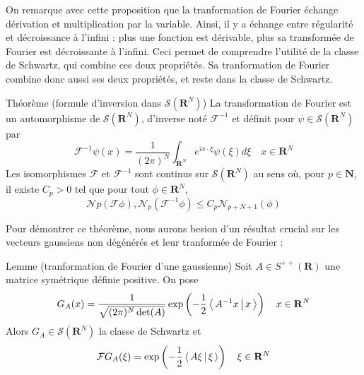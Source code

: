         On remarque avec cette proposition que la tranformation de Fourier échange dérivation et multiplication par la variable. Ainsi, il y a échange entre régularité et décroissance à l’infini : plus une fonction est dérivable, plus sa transformée de Fourier est décroissante à l’infini. Ceci permet de comprendre l’utilité de la classe de Schwartz, qui combine ces deux propriétés. Sa tranformation de Fourier combine donc aussi ses deux propriétés, et reste dans la classe de Schwartz.

        \begin{omed}{Théorème (formule d’inversion dans $\mathcal{S}(\mathbf{R}^N)$)}
            La transformation de Fourier est un automorphisme de $\mathcal{S}(\mathbf{R}^N)$, d’inverse noté $\mathcal{F}^{-1}$ et définit pour $\psi \in \mathcal{S}(\mathbf{R}^N)$ par 
            \[ \mathcal{F}^{-1}\psi(x) = \frac{1}{(2\pi)^N} \int_{\mathbf{R}^N} e^{i x \cdot \xi} \psi(\xi) d\xi \quad x \in \mathbf{R}^N \]   
            Les isomorphismes $\mathcal{F}$ et $\mathcal{F}^{-1}$ sont continus sur $\mathcal{S}(\mathbf{R}^N)$ au sens où, pour $p \in \mathbf{N}$, il existe $C_p > 0$ tel que pour tout $\phi \in \mathbf{R}^N$, 
            \[ \mathcal{N} p(\mathcal{F}\phi), \mathcal{N}_p(\mathcal{F}^{-1}\phi) \leq C_p \mathcal{N}_{p + N + 1}(\phi) \]
        \end{omed}

        Pour démontrer ce théorème, nous aurons besion d’un résultat crucial sur les vecteurs gaussiens non dégénérés et leur tranformée de Fourier :

        \begin{omed}{Lemme (tranformation de Fourier d’une gaussienne)}
            Soit $A \in S^{++}(\mathbf{R})$ une matrice symétrique définie positive. On pose 
            \[ G_A(x) = \frac{1}{\sqrt{(2\pi)^N \det(A)}}\exp\left(-\frac{1}{2} \left< \, A^{-1}x \, \middle| \, x \, \right>\right) \quad x \in \mathbf{R}^N \]   
            Alors $G_A \in \mathcal{S}(\mathbf{R}^N)$ la classe de Schwartz et 
            \[ \mathcal{F}G_A(\xi) = \exp\left(-\frac{1}{2}\left< \, A\xi \, \middle| \, \xi \, \right>\right) \quad \xi \in \mathbf{R}^N \]   
        \end{omed}

